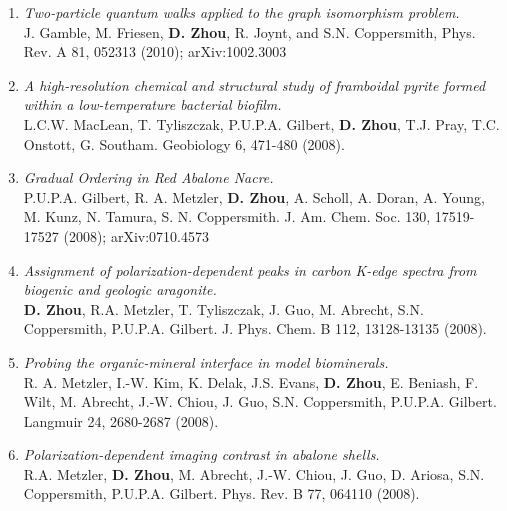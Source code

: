 \documentclass[centered,11pt,overlapped]{res}
\begin{document}
\begin{resume}
{\begin{enumerate}[leftmargin=-0.1in]
{\bf D. Zhou}, A. Lang, and R. Joynt, QIP 9, 727 (2010); arXiv:0912.3313 
\item {\em Two-particle quantum walks applied to the graph isomorphism problem.} \\
J. Gamble, M. Friesen, {\bf D. Zhou}, R. Joynt, and S.N. Coppersmith, Phys. Rev. A 81, 052313 (2010); arXiv:1002.3003
\item {\em A high-resolution chemical and structural study of framboidal pyrite formed within a low-temperature bacterial biofilm.}\\
L.C.W. MacLean, T. Tyliszczak, P.U.P.A. Gilbert, {\bf D. Zhou}, T.J. Pray, T.C. Onstott, G. Southam.  Geobiology 6, 471-480 (2008).
\item {\em Gradual Ordering in Red Abalone Nacre.}\\
P.U.P.A. Gilbert, R. A. Metzler, {\bf D. Zhou}, A. Scholl, A. Doran, A. Young, M. Kunz, N. Tamura, S. N. Coppersmith. J. Am. Chem. Soc. 130, 17519-17527 (2008); arXiv:0710.4573
\item {\em Assignment of polarization-dependent peaks in carbon K-edge spectra from biogenic and geologic aragonite.}\\
{\bf D. Zhou}, R.A. Metzler, T. Tyliszczak, J. Guo, M. Abrecht, S.N. Coppersmith, P.U.P.A. Gilbert. J. Phys. Chem. B 112, 13128-13135 (2008). 
\item {\em Probing the organic-mineral interface in model biominerals.}\\
R. A. Metzler, I.-W. Kim, K. Delak, J.S. Evans, {\bf D. Zhou}, E. Beniash, F. Wilt, M. Abrecht, J.-W. Chiou, J. Guo, S.N. Coppersmith, P.U.P.A. Gilbert.  Langmuir 24, 2680-2687 (2008). 
\item {\em Polarization-dependent imaging contrast in abalone shells.}\\
R.A. Metzler, {\bf D. Zhou}, M. Abrecht, J.-W. Chiou, J. Guo, D. Ariosa, S.N. Coppersmith, P.U.P.A. Gilbert. Phys. Rev. B 77, 064110 (2008).
\end{enumerate}

}




\end{resume}
\end{document}
